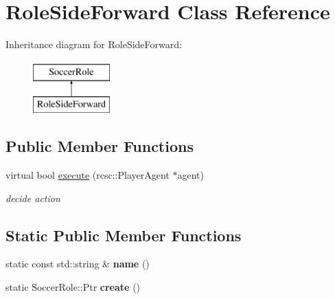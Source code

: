 \hypertarget{classRoleSideForward}{
\section{RoleSideForward Class Reference}
\label{classRoleSideForward}
}
Inheritance diagram for RoleSideForward:\begin{figure}[H]
\begin{center}
\leavevmode
\includegraphics[height=2.000000cm]{classRoleSideForward}
\end{center}
\end{figure}
\subsection*{Public Member Functions}
\begin{DoxyCompactItemize}
\item 
\hypertarget{classRoleSideForward_ac91f42ed66612f89e0628752a7114668}{
virtual bool \hyperlink{classRoleSideForward_ac91f42ed66612f89e0628752a7114668}{execute} (rcsc::PlayerAgent $\ast$agent)}
\label{classRoleSideForward_ac91f42ed66612f89e0628752a7114668}

\begin{DoxyCompactList}\small\item\em decide action \item\end{DoxyCompactList}\end{DoxyCompactItemize}
\subsection*{Static Public Member Functions}
\begin{DoxyCompactItemize}
\item 
\hypertarget{classRoleSideForward_a29abaece0afd1eebf156dbed5f454d3d}{
static const std::string \& {\bfseries name} ()}
\label{classRoleSideForward_a29abaece0afd1eebf156dbed5f454d3d}

\item 
\hypertarget{classRoleSideForward_aa54dfd7a433743d2d5159f037ede27ec}{
static SoccerRole::Ptr {\bfseries create} ()}
\label{classRoleSideForward_aa54dfd7a433743d2d5159f037ede27ec}

\end{DoxyCompactItemize}
